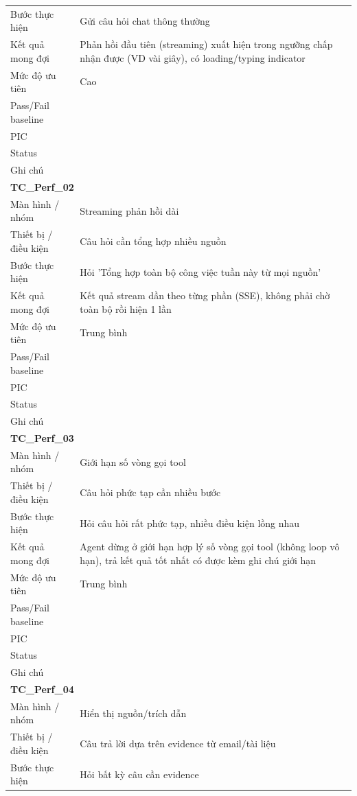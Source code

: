 \documentclass[12pt,a4paper]{article}
\begin{document}
\begin{longtable}{p{3.0cm}p{11.5cm}}
Bước thực hiện & Gửi câu hỏi chat thông thường \\
Kết quả mong đợi & Phản hồi đầu tiên (streaming) xuất hiện trong ngưỡng chấp nhận được (VD vài giây), có loading/typing indicator \\
Mức độ ưu tiên & Cao \\
Pass/Fail baseline &  \\
PIC &  \\
Status &  \\
Ghi chú &  \\
\midrule
\multicolumn{2}{l}{\textbf{TC\_Perf\_02}} \\
Màn hình / nhóm & Streaming phản hồi dài \\
Thiết bị / điều kiện & Câu hỏi cần tổng hợp nhiều nguồn \\
Bước thực hiện & Hỏi 'Tổng hợp toàn bộ công việc tuần này từ mọi nguồn' \\
Kết quả mong đợi & Kết quả stream dần theo từng phần (SSE), không phải chờ toàn bộ rồi hiện 1 lần \\
Mức độ ưu tiên & Trung bình \\
Pass/Fail baseline &  \\
PIC &  \\
Status &  \\
Ghi chú &  \\
\midrule
\multicolumn{2}{l}{\textbf{TC\_Perf\_03}} \\
Màn hình / nhóm & Giới hạn số vòng gọi tool \\
Thiết bị / điều kiện & Câu hỏi phức tạp cần nhiều bước \\
Bước thực hiện & Hỏi câu hỏi rất phức tạp, nhiều điều kiện lồng nhau \\
Kết quả mong đợi & Agent dừng ở giới hạn hợp lý số vòng gọi tool (không loop vô hạn), trả kết quả tốt nhất có được kèm ghi chú giới hạn \\
Mức độ ưu tiên & Trung bình \\
Pass/Fail baseline &  \\
PIC &  \\
Status &  \\
Ghi chú &  \\
\midrule
\multicolumn{2}{l}{\textbf{TC\_Perf\_04}} \\
Màn hình / nhóm & Hiển thị nguồn/trích dẫn \\
Thiết bị / điều kiện & Câu trả lời dựa trên evidence từ email/tài liệu \\
Bước thực hiện & Hỏi bất kỳ câu cần evidence \\

\end{longtable}
\end{document}
